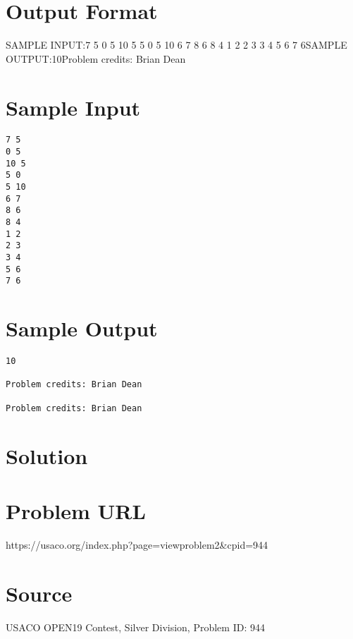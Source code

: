 \documentclass[12pt]{article}
\begin{document}
\section*{Output Format}
SAMPLE INPUT:7 5
0 5
10 5
5 0
5 10
6 7
8 6
8 4
1 2
2 3
3 4
5 6
7 6SAMPLE OUTPUT:10Problem credits: Brian Dean

\section*{Sample Input}
\begin{verbatim}
7 5
0 5
10 5
5 0
5 10
6 7
8 6
8 4
1 2
2 3
3 4
5 6
7 6
\end{verbatim}

\section*{Sample Output}
\begin{verbatim}
10

Problem credits: Brian Dean

Problem credits: Brian Dean
\end{verbatim}

\section*{Solution}


\section*{Problem URL}
https://usaco.org/index.php?page=viewproblem2&cpid=944

\section*{Source}
USACO OPEN19 Contest, Silver Division, Problem ID: 944
\end{document}
